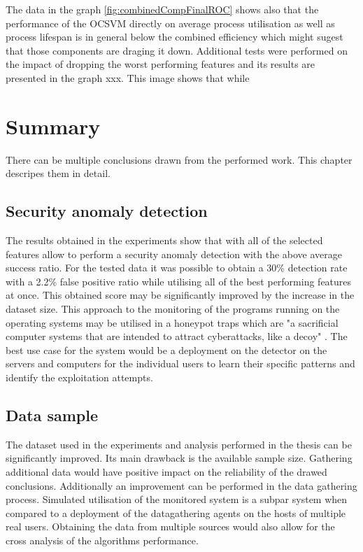 \documentclass[a4paper,twoside,12pt]{book}
\begin{document}
The data in the graph \ref{fig:combinedCompFinalROC} shows also that the performance of the OCSVM directly on average process utilisation
as well as process lifespan is in general below the combined efficiency which might sugest that those components are draging it down. 
Additional tests were performed on the impact of dropping the worst performing features and its results are presented in the graph xxx. 
This image shows that while 



\chapter{Summary}

There can be multiple conclusions drawn from the performed work. This chapter descripes them in 
detail.

\section{Security anomaly detection}

The results obtained in the experiments show that with all of the selected features allow 
to perform a security anomaly detection with the above average success ratio. For the tested
data it was possible to obtain a 30\% detection rate with a 2.2\% false positive ratio while
utilising all of the best performing features at once. This obtained score may be significantly 
improved by the increase in the dataset size. This approach to the monitoring of the programs 
running on the operating systems may be utilised in a honeypot traps which are "a sacrificial 
computer systems that are intended to attract cyberattacks, like a decoy" \cite{bib:Honeypot}. 
The best use case for the system would be a deployment on the detector on the servers and 
computers for the individual users to learn their specific patterns and identify the exploitation
attempts.

\section{Data sample}

The dataset used in the experiments and analysis performed in the thesis can be significantly 
improved. Its main drawback is the available sample size. Gathering additional data would have
positive impact on the reliability of the drawed conclusions. Additionally an improvement 
can be performed in the data gathering process. Simulated utilisation of the monitored system
is a subpar system when compared to a deployment of the datagathering agents on the hosts of 
multiple real users. Obtaining the data from multiple sources would also allow for the cross
analysis of the algorithms performance. 
\end{document}
